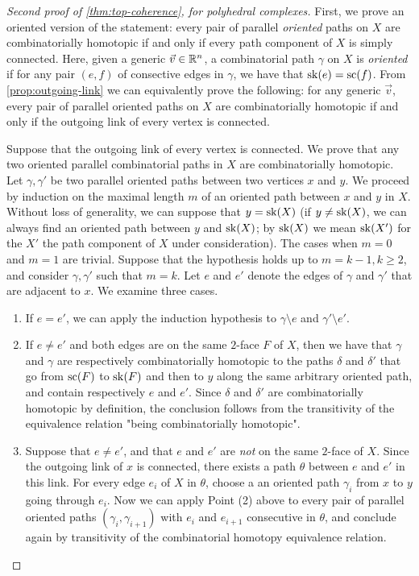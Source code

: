 \begin{proof}[Second proof of {\cref{thm:top-coherence}}, for polyhedral complexes]
    First, we prove an oriented version of the statement: every pair of parallel \emph{oriented} paths on $X$ are combinatorially homotopic if and only if every path component of $X$ is simply connected.
    Here, given a generic $\vec v \in \mathbb R^n$, a combinatorial path $\gamma$ on $X$ is \emph{oriented} if for any pair $(e, f)$ of consective edges in $\gamma$, we have that $\mathrm{sk}(e)=\mathrm{sc}(f)$.  
    From \cref{prop:outgoing-link} we can equivalently prove the following: for any generic $\vec v$, every pair of parallel oriented paths on $X$ are combinatorially homotopic if and only if the outgoing link of every vertex is connected.

    Suppose that the outgoing link of every vertex is connected. 
    We prove that any two oriented parallel combinatorial paths in $X$ are combinatorially homotopic. 
    Let $\gamma, \gamma'$ be two parallel oriented paths between two vertices $x$ and $y$. 
    We proceed by induction on the maximal length $m$ of an oriented path between $x$ and $y$ in $X$. 
    Without loss of generality, we can suppose that $y=\mathrm{sk}(X)$ (if $y\neq\mathrm{sk}(X)$, we can always find an oriented path between $y$ and $\mathrm{sk}(X)$; by $\mathrm{sk}(X)$ we mean $\mathrm{sk}(X')$ for the $X'$ the path component of $X$ under consideration).
    The cases when $m=0$ and $m=1$ are trivial. 
    Suppose that the hypothesis holds up to $m=k-1, k\geq 2$, and consider $\gamma,\gamma'$ such that $m=k$. 
    Let $e$ and $e'$ denote the edges of $\gamma$ and $\gamma'$ that are adjacent to $x$. 
    We examine three cases.
    \begin{enumerate}
        \item If $e=e'$, we can apply the induction hypothesis to $\gamma \setminus e$ and $\gamma' \setminus e'$. 
        \item If $e \neq e'$ and both edges are on the same $2$-face $F$ of $X$, then we have that $\gamma$ and $\gamma$ are respectively combinatorially homotopic to the paths $\delta$ and $\delta'$ that go from $\mathrm{sc}(F)$ to $\mathrm{sk}(F)$ and then to $y$ along the same arbitrary oriented path, and contain respectively $e$ and $e'$. 
        Since $\delta$ and $\delta'$ are combinatorially homotopic by definition, the conclusion follows from the transitivity of the equivalence relation "being combinatorially homotopic". 
        \item Suppose that $e\neq e'$, and that $e$ and $e'$ are \emph{not} on the same $2$-face of $X$. 
        Since the outgoing link of $x$ is connected, there exists a path $\theta$ between $e$ and $e'$ in this link. 
        For every edge $e_i$ of $X$ in $\theta$, choose a an oriented path $\gamma_i$ from $x$ to $y$ going through $e_i$. 
        Now we can apply Point (2) above to every pair of parallel oriented paths $(\gamma_i, \gamma_{i+1})$ with $e_i$ and $e_{i+1}$ consecutive in $\theta$, and conclude again by transitivity of the combinatorial homotopy equivalence relation. 
    \end{enumerate}


\end{proof}
